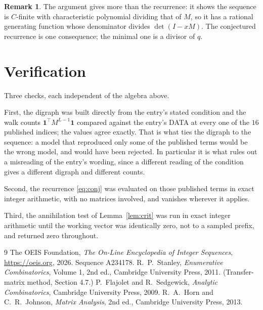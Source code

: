 \documentclass[11pt,a4paper]{article}
\theoremstyle{plain}
\theoremstyle{definition}
\newtheorem{remark}[theorem]{Remark}
\begin{document}
\begin{remark}
The argument gives more than the recurrence: it shows the sequence is $C$-finite with
characteristic polynomial dividing that of $M$, so it has a rational generating function
whose denominator divides $\det(I-xM)$. The conjectured recurrence is one consequence; the
minimal one is a divisor of $q$.
\end{remark}

\section{Verification}

Three checks, each independent of the algebra above.

First, the digraph was built directly from the entry's stated condition and the walk counts
$\mathbf{1}^{\!\top}M^{L-1}\mathbf{1}$ compared against the entry's DATA at
every one of the $16$ published indices; the values agree exactly. That is what ties
the digraph to the sequence: a model that reproduced only some of the published terms would
be the wrong model, and would have been rejected. In particular it is what rules out a
misreading of the entry's wording, since a different reading of the condition gives a
different digraph and different counts.

Second, the recurrence \eqref{eq:conj} was evaluated on those published terms in exact
integer arithmetic, with no matrices involved, and vanishes wherever it applies.

Third, the annihilation test of Lemma~\ref{lem:crit} was run in exact integer arithmetic
until the working vector was identically zero, not to a sampled prefix, and returned zero
throughout.

\begin{thebibliography}{9}
 The OEIS Foundation, \emph{The On-Line Encyclopedia of Integer
Sequences}, \url{https://oeis.org}, 2026. Sequence A234178.
 R.~P.~Stanley, \emph{Enumerative Combinatorics}, Volume 1, 2nd ed.,
Cambridge University Press, 2011. (Transfer-matrix method, Section 4.7.)
 P.~Flajolet and R.~Sedgewick, \emph{Analytic Combinatorics}, Cambridge
University Press, 2009.
 R.~A.~Horn and C.~R.~Johnson, \emph{Matrix Analysis}, 2nd ed., Cambridge
University Press, 2013.
\end{thebibliography}
\end{document}
